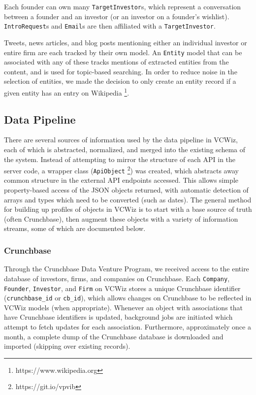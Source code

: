 Each founder can own many \texttt{TargetInvestor}s, which represent a conversation between a founder and an investor (or an investor on a founder's wishlist). \texttt{IntroRequest}s and \texttt{Email}s are then affiliated with a \texttt{TargetInvestor}.

Tweets, news articles, and blog posts mentioning either an individual investor or entire firm are each tracked by their own model. An \texttt{Entity} model that can be associated with any of these tracks mentions of extracted entities from the content, and is used for topic-based searching. In order to reduce noise in the selection of entities, we made the decision to only create an entity record if a given entity has an entry on Wikipedia \footnote{https://www.wikipedia.org}.

\subsection{Data Pipeline}
\label{ch4:data}

There are several sources of information used by the data pipeline in VCWiz, each of which is abstracted, normalized, and merged into the existing schema of the system.  Instead of attempting to mirror the structure of each API in the server code, a wrapper class (\texttt{ApiObject} \footnote{https://git.io/vpvib}) was created, which abstracts away common structure in the external API endpoints accessed. This allows simple property-based access of the JSON objects returned, with automatic detection of arrays and types which need to be converted (such as dates). The general method for building up profiles of objects in VCWiz is to start with a base source of truth (often Crunchbase), then augment these objects with a variety of information streams, some of which are documented below.

\subsubsection{Crunchbase}

Through the Crunchbase Data Venture Program, we received access to the entire database of investors, firms, and companies on Crunchbase. Each \texttt{Company}, \texttt{Founder}, \texttt{Investor}, and \texttt{Firm} on VCWiz stores a unique Crunchbase identifier (\texttt{crunchbase\_id} or \texttt{cb\_id}), which allows changes on Crunchbase to be reflected in VCWiz models (when appropriate). Whenever an object with associations that have Crunchbase identifiers is updated, background jobs are initiated which attempt to fetch updates for each association. Furthermore, approximately once a month, a complete dump of the Crunchbase database is downloaded and imported (skipping over existing records).

